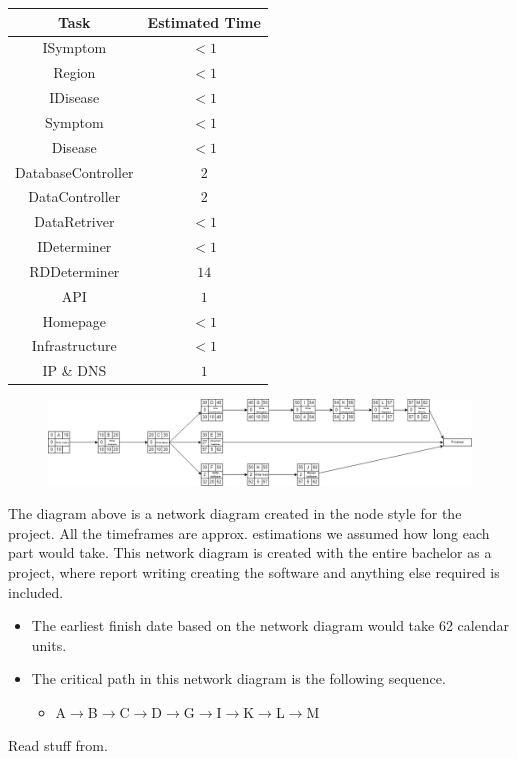 \begin{center}
	\begin{tabular}[h]{|c|c|}
		\hline
		Task & Estimated Time \\ \hline
		ISymptom & $<1$\\ \hline
		Region & $<1$\\ \hline
		IDisease & $<1$\\ \hline
		Symptom &  $<1$\\ \hline
		Disease & $<1$\\ \hline
		DatabaseController & $2$\\ \hline
		DataController &  $2$\\ \hline
		DataRetriver & $<1$\\ \hline
		IDeterminer &  $<1$\\ \hline
		RDDeterminer & $14$\\ \hline
		API & $1$\\ \hline
		Homepage & $<1$\\ \hline
		Infrastructure & $<1$\\ \hline
		IP \& DNS & $1$\\ \hline
	\end{tabular}
\end{center}


\pagebreak
\begin{figure}
	\includegraphics[width=40em,keepaspectratio]{Network Diagram.png}
\end{figure}

The diagram above is a network diagram created in the node style for the project. All the timeframes are approx. estimations we assumed how long each part would take. This network diagram is created with the entire bachelor as a project, where report writing creating the software and anything else required is included.

\begin{itemize}
	\item The earliest finish date based on the network diagram would take 62 calendar units.
	\item The critical path in this network diagram is the following sequence.
	\begin{itemize}
		\item A$\rightarrow$B$\rightarrow$C$\rightarrow$D$\rightarrow$G$\rightarrow$I$\rightarrow$K$\rightarrow$L$\rightarrow$M
	\end{itemize}
\end{itemize}


Read stuff from\cite{Larson2021}.
